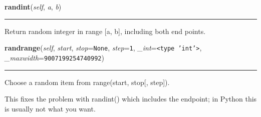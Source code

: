     \label{random:Random:randint}

    \vspace{0.5ex}

\hspace{.8\funcindent}\begin{boxedminipage}{\funcwidth}

    \raggedright \textbf{randint}(\textit{self}, \textit{a}, \textit{b})

    \vspace{-1.5ex}

    \rule{\textwidth}{0.5\fboxrule}
\setlength{\parskip}{2ex}
    Return random integer in range [a, b], including both end points.

\setlength{\parskip}{1ex}
    \end{boxedminipage}

    \label{random:Random:randrange}

    \vspace{0.5ex}

\hspace{.8\funcindent}\begin{boxedminipage}{\funcwidth}

    \raggedright \textbf{randrange}(\textit{self}, \textit{start}, \textit{stop}={\tt None}, \textit{step}={\tt 1}, \textit{\_int}={\tt {\textless}type 'int'{\textgreater}}, \textit{\_maxwidth}={\tt 9007199254740992})

    \vspace{-1.5ex}

    \rule{\textwidth}{0.5\fboxrule}
\setlength{\parskip}{2ex}
    Choose a random item from range(start, stop[, step]).

    This fixes the problem with randint() which includes the endpoint; in 
    Python this is usually not what you want.

\setlength{\parskip}{1ex}
    \end{boxedminipage}

    \label{random:Random:sample}

    \vspace{0.5ex}

